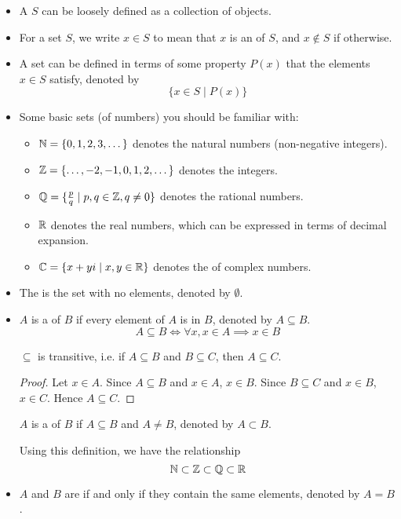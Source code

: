 \begin{itemize}
\item A  $S$ can be loosely defined as a collection of objects.

\item For a set $S$, we write $x \in S$ to mean that $x$ is an  of $S$, and $x \notin S$ if otherwise.

\item A set can be defined in terms of some property $P(x)$ that the elements $x \in S$ satisfy, denoted by 
\[ \{x \in S \mid P(x)\} \]

\item Some basic sets (of numbers) you should be familiar with:
\begin{itemize}
\item $\mathbb N=\{0,1,2,3,\dots\}$ denotes the natural numbers (non-negative integers).
\item $\mathbb Z=\{\dots,-2,-1,0,1,2,\dots\}$ denotes the integers.
\item $\mathbb Q=\{\frac{p}{q} \mid p,q\in\mathbb Z, q\neq0\}$ denotes the rational numbers.
\item $\mathbb R$ denotes the real numbers, which can be expressed in terms of decimal expansion.
\item $\mathbb C=\{x+yi \mid x,y\in\mathbb R\}$ denotes the of complex numbers.
\end{itemize}

\item The  is the set with no elements, denoted by $\emptyset$.

\item $A$ is a  of $B$ if every element of $A$ is in $B$, denoted by $A \subseteq B$.
\[ A \subseteq B \iff \forall x, x\in A \implies x\in B \]

$\subseteq$ is transitive, i.e. if $A \subseteq B$ and $B \subseteq C$, then $A \subseteq C$.
\begin{proof}
Let $x\in A$. 
Since $A \subseteq B$ and $x\in A$, $x\in B$. 
Since $B \subseteq C$ and $x\in B$, $x\in C$. 
Hence $A \subseteq C$.
\end{proof}

$A$ is a  of $B$ if $A \subseteq B$ and $A \neq B$, denoted by $A \subset B$.

Using this definition, we have the relationship 
\[ \mathbb N \subset \mathbb Z \subset \mathbb Q \subset \mathbb R \]

\item $A$ and $B$ are  if and only if they contain the same elements, denoted by $A=B$.


\end{itemize}
